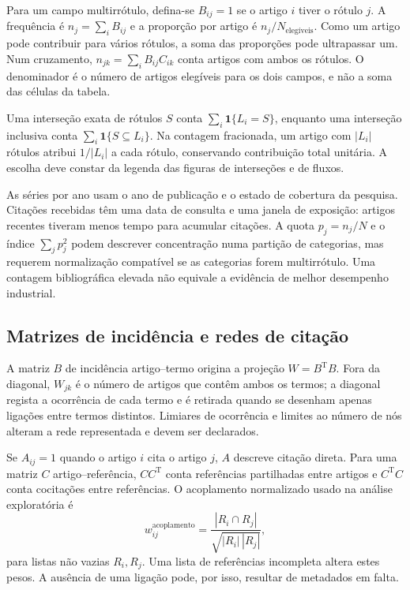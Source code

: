 Para um campo multirrótulo, defina-se $B_{ij}=1$ se o artigo $i$ tiver o rótulo $j$. A frequência é $n_j=\sum_iB_{ij}$ e a proporção por artigo é $n_j/N_{\mathrm{elegíveis}}$. Como um artigo pode contribuir para vários rótulos, a soma das proporções pode ultrapassar um. Num cruzamento, $n_{jk}=\sum_iB_{ij}C_{ik}$ conta artigos com ambos os rótulos. O denominador é o número de artigos elegíveis para os dois campos, e não a soma das células da tabela.

Uma interseção exata de rótulos $S$ conta $\sum_i\mathbf1\{L_i=S\}$, enquanto uma interseção inclusiva conta $\sum_i\mathbf1\{S\subseteq L_i\}$. Na contagem fracionada, um artigo com $|L_i|$ rótulos atribui $1/|L_i|$ a cada rótulo, conservando contribuição total unitária. A escolha deve constar da legenda das figuras de interseções e de fluxos.

As séries por ano usam o ano de publicação e o estado de cobertura da pesquisa. Citações recebidas têm uma data de consulta e uma janela de exposição: artigos recentes tiveram menos tempo para acumular citações. A quota $p_j=n_j/N$ e o índice $\sum_jp_j^2$ podem descrever concentração numa partição de categorias, mas requerem normalização compatível se as categorias forem multirrótulo. Uma contagem bibliográfica elevada não equivale a evidência de melhor desempenho industrial.

\subsection{Matrizes de incidência e redes de citação}
\label{sec:mat-redes}
A matriz $B$ de incidência artigo--termo origina a projeção $W=B^{\mathrm T}B$. Fora da diagonal, $W_{jk}$ é o número de artigos que contêm ambos os termos; a diagonal regista a ocorrência de cada termo e é retirada quando se desenham apenas ligações entre termos distintos. Limiares de ocorrência e limites ao número de nós alteram a rede representada e devem ser declarados.

Se $A_{ij}=1$ quando o artigo $i$ cita o artigo $j$, $A$ descreve citação direta. Para uma matriz $C$ artigo--referência, $CC^{\mathrm T}$ conta referências partilhadas entre artigos e $C^{\mathrm T}C$ conta cocitações entre referências. O acoplamento normalizado usado na análise exploratória é
\begin{equation}
w_{ij}^{\mathrm{acoplamento}}=
\frac{|R_i\cap R_j|}{\sqrt{|R_i|\,|R_j|}},
\label{eq:mat-acoplamento}
\end{equation}
para listas não vazias $R_i,R_j$. Uma lista de referências incompleta altera estes pesos. A ausência de uma ligação pode, por isso, resultar de metadados em falta.

